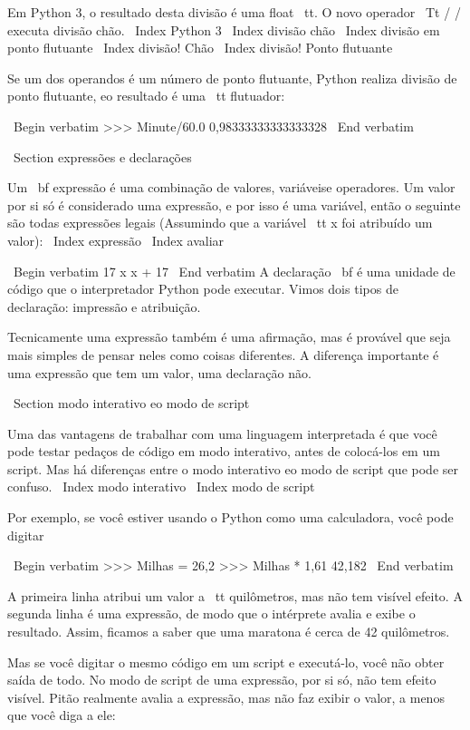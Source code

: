 \documentclass[10pt]{book}
\begin{document}
\begin {itemize}
{Em Python 3, o resultado desta divisão é uma {float \ tt}. O novo operador
{\ Tt / /} executa divisão chão.
\ Index {Python 3}
\ Index {divisão chão}
\ Index {divisão em ponto flutuante}
\ Index {divisão! Chão}
\ Index {divisão! Ponto flutuante}

Se um dos operandos é um número de ponto flutuante, Python realiza
divisão de ponto flutuante, eo resultado é uma {\ tt flutuador}:

\ Begin {verbatim}
>>> Minute/60.0
0,98333333333333328
\ End {verbatim}


\ Section {expressões e declarações}

Um {\ bf expressão} é uma combinação de valores, variáveis ​​e operadores.
Um valor por si só é considerado uma expressão, e por isso é
uma variável, então o seguinte são todas expressões legais
(Assumindo que a variável {\ tt x} foi atribuído um valor):
\ Index {expressão}
\ Index {avaliar}

\ Begin {verbatim}
17
x
x + 17
\ End {verbatim}
%
A declaração {\ bf} é uma unidade de código que o interpretador Python pode
executar. Vimos dois tipos de declaração: impressão e
atribuição.

Tecnicamente uma expressão também é uma afirmação, mas é provável que seja
mais simples de pensar neles como coisas diferentes. A diferença importante
é uma expressão que tem um valor, uma declaração não.


\ Section {modo interativo eo modo de script}

Uma das vantagens de trabalhar com uma linguagem interpretada é que
você pode testar pedaços de código em modo interativo, antes de colocá-los
em um script. Mas há diferenças entre o modo interativo
eo modo de script que pode ser confuso.
\ Index {modo interativo}
\ Index {modo de script}

Por exemplo, se você estiver usando o Python como uma calculadora, você pode digitar

\ Begin {verbatim}
>>> Milhas = 26,2
>>> Milhas * 1,61
42,182
\ End {verbatim}

A primeira linha atribui um valor a {\ tt quilômetros}, mas não tem visível
efeito. A segunda linha é uma expressão, de modo que o intérprete
avalia e exibe o resultado. Assim, ficamos a saber que uma maratona é
cerca de 42 quilômetros.

Mas se você digitar o mesmo código em um script e executá-lo, você não obter
saída de todo. No modo de script de uma expressão, por si só, não tem
efeito visível. Pitão realmente avalia a expressão, mas não faz
exibir o valor, a menos que você diga a ele:

}
\end{itemize}
\end{document}
